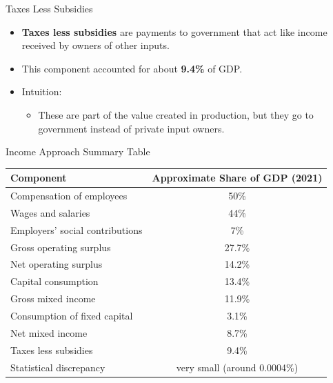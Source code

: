 \documentclass[aspectratio=169]{beamer}
\begin{document}
\begin{frame}{Taxes Less Subsidies}
\transfade
\begin{itemize}[<+->]
  \item \textbf{Taxes less subsidies} are payments to government that act like income received by owners of other inputs.
  \item This component accounted for about \textbf{9.4\%} of GDP.
  \item Intuition:
  \begin{itemize}[<+->]
    \item These are part of the value created in production, but they go to government instead of private input owners.
  \end{itemize}
\end{itemize}
\end{frame}

\begin{frame}{Income Approach Summary Table}
\transfade
\small
\begin{tabular}{l c}
\toprule
\textbf{Component} & \textbf{Approximate Share of GDP (2021)} \\
\midrule
Compensation of employees & 50\% \\
\quad Wages and salaries & 44\% \\
\quad Employers' social contributions & 7\% \\
Gross operating surplus & 27.7\% \\
\quad Net operating surplus & 14.2\% \\
\quad Capital consumption & 13.4\% \\
Gross mixed income & 11.9\% \\
\quad Consumption of fixed capital & 3.1\% \\
\quad Net mixed income & 8.7\% \\
Taxes less subsidies & 9.4\% \\
Statistical discrepancy & very small (around 0.0004\%) \\
\bottomrule
\end{tabular}
\end{frame}

\end{document}
